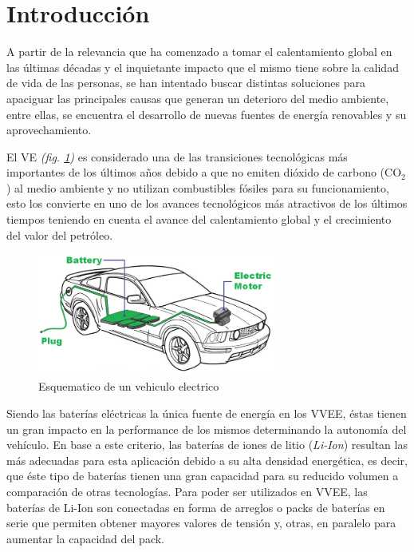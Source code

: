 \documentclass[10pt,a4paper]{article}
\begin{document}
\newpage
\tableofcontents

\newpage

\section{Introducción}

\noindent A partir de la relevancia que ha comenzado a tomar el 
calentamiento global en las últimas décadas y el inquietante impacto que 
el mismo tiene sobre la calidad de vida de las personas, se han intentado 
buscar distintas soluciones para apaciguar las principales causas que 
generan un deterioro del medio ambiente, entre ellas, se encuentra el 
desarrollo de nuevas fuentes de energía renovables y su aprovechamiento.

\noindent El \acrfull{VE} \emph{(fig. \ref{EV})} es considerado 
una de las transiciones tecnológicas más importantes de los últimos años 
debido a que no emiten dióxido de carbono ($\mathrm{CO_2}$) al medio 
ambiente y no utilizan combustibles fósiles para su funcionamiento, esto 
los convierte en uno de los avances tecnológicos más atractivos de los 
últimos tiempos teniendo en cuenta el avance del calentamiento global y el 
crecimiento del valor del petróleo.

\begin{figure}[h!]
    \begin{center}
	\includegraphics[width=0.7\textwidth]{EV.png}
	\caption{Esquematico de un vehiculo electrico}
	\label{EV}
    \end{center}
\end{figure}

\noindent Siendo las baterías eléctricas la única fuente de energía en los 
\acrfull{VVEE}, éstas tienen un gran impacto en la performance de los mismos 
determinando la autonomía del vehículo. En base a este criterio, las 
baterías de iones de litio (\emph{Li-Ion}) resultan las más adecuadas para 
esta aplicación debido a su alta densidad energética, es decir, que éste 
tipo de baterías tienen una gran capacidad para su reducido volumen a 
comparación de otras tecnologías. Para poder ser utilizados en
\acrshort{VVEE}, las baterías de Li-Ion son conectadas en forma de arreglos 
o packs de baterías en serie que permiten obtener mayores valores de tensión
y, otras, en paralelo para aumentar la capacidad del pack.
\end{document}
